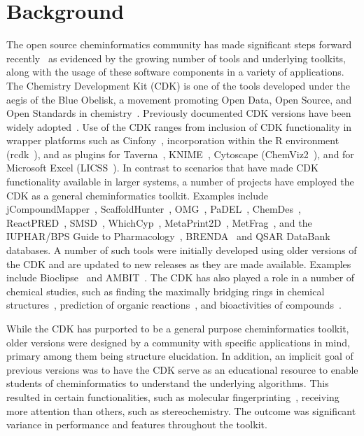 \documentclass[doublespacing]{bmcart}
\begin{document}
\section*{Background}

The open source cheminformatics community has made significant steps
forward recently~\cite{OBoyle2011b} as evidenced by the growing number
of tools and underlying toolkits, along with the usage of these
software components in a variety of applications.
The Chemistry Development Kit (CDK) is one of the tools developed
under the aegis of the Blue Obelisk, a movement promoting Open Data,
Open Source, and Open Standards in chemistry~\cite{OBoyle2011b,Guha2006}.
Previously documented CDK versions have been widely adopted~\cite{Steinbeck2003,Steinbeck2006}.
Use of the CDK ranges from inclusion of CDK functionality in
wrapper platforms such as Cinfony~\cite{OBoyle2008}, incorporation
within the R environment (rcdk~\cite{Guha2007}), and as plugins for
Taverna~\cite{Truszkowski2011}, 
KNIME~\cite{Beisken2013}, Cytoscape (ChemViz2~\cite{ChemViz2}), and for
Microsoft Excel (LICSS~\cite{Lawson2012}).
In contrast to scenarios that have made CDK functionality available in
larger systems, a number of projects have employed the CDK as a
general cheminformatics toolkit. Examples include 
jCompoundMapper~\cite{Hinselmann2011}, ScaffoldHunter~\cite{wetzel2009interactive,Klein2013}, OMG~\cite{Peironcely2012},
PaDEL~\cite{yap2011padel}, ChemDes~\cite{Dong2015},
ReactPRED~\cite{ReactPRED}, SMSD~\cite{Rahman2009,Rahman2014,Rahman2016},
WhichCyp~\cite{Rostkowski2013}, MetaPrint2D~\cite{Carlsson2010}, MetFrag~\cite{Wolf2010},
and the IUPHAR/BPS Guide to Pharmacology~\cite{Southan2016}, BRENDA~\cite{Placzek2017} and
QSAR DataBank~\cite{Ruusmann2015} databases.
A number of such tools were initially developed using older versions
of the CDK and are updated to new releases as they are made
available. Examples include Bioclipse~\cite{spjuth2007bioclipse,
spjuth2009bioclipse} and
AMBIT~\cite{jeliazkova2011ambit,jeliazkova2011ambitsmarts,kochev2013ambit}. The
CDK has also played a role in a number of chemical studies, such as finding
the maximally bridging rings in chemical structures~\cite{Marth2015},
prediction of organic reactions~\cite{Segler2016}, and bioactivities
of compounds~\cite{Alvarsson2016}.

While the CDK has purported to be a general purpose cheminformatics
toolkit, older versions were designed by a community with specific
applications in mind, primary among them being structure elucidation. In
addition, an implicit goal of previous versions was to have the CDK
serve as an educational resource to enable students of cheminformatics
to understand the underlying algorithms. This resulted in certain
functionalities, such as molecular fingerprinting~\cite{Clark2014,Cannon2006},
receiving more attention than others, such as stereochemistry. The
outcome was significant variance in performance and features
throughout the toolkit.
\end{document}
